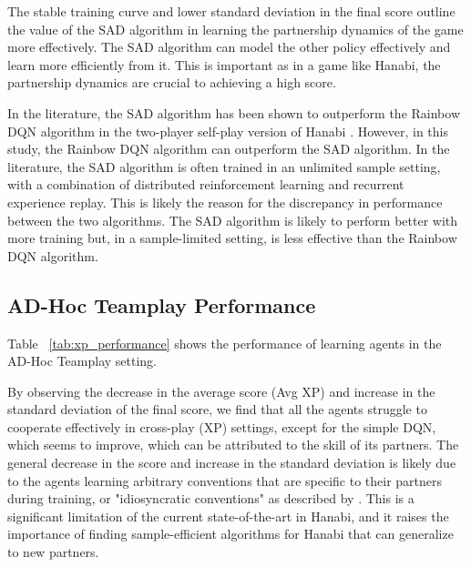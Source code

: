 The stable training curve and lower standard deviation in the final score outline the value of the SAD algorithm in learning the partnership dynamics of the game more effectively. The SAD algorithm can model the other policy effectively and learn more efficiently from it. This is important as in a game like Hanabi, the partnership dynamics are crucial to achieving a high score.

In the literature, the SAD algorithm has been shown to outperform the Rainbow DQN algorithm in the two-player self-play version of Hanabi \cite{huSimplifiedActionDecoder2021}. However, in this study, the Rainbow DQN algorithm can outperform the SAD algorithm. In the literature, the SAD algorithm is often trained in an unlimited sample setting, with a combination of distributed reinforcement learning and recurrent experience replay. This is likely the reason for the discrepancy in performance between the two algorithms. The SAD algorithm is likely to perform better with more training but, in a sample-limited setting, is less effective than the Rainbow DQN algorithm.

\subsection*{AD-Hoc Teamplay Performance}

Table ~\ref{tab:xp_performance} shows the performance of learning agents in the AD-Hoc Teamplay setting.

By observing the decrease in the average score (Avg XP) and increase in the standard deviation of the final score, we find that all the agents struggle to cooperate effectively in cross-play (XP) settings, except for the simple DQN, which seems to improve, which can be attributed to the skill of its partners. The general decrease in the score and increase in the standard deviation is likely due to the agents learning arbitrary conventions that are specific to their partners during training, or "idiosyncratic conventions" as described by \textcite{lucasAnyPlayIntrinsicAugmentation2022}. This is a significant limitation of the current state-of-the-art in Hanabi, and it raises the importance of finding sample-efficient algorithms for Hanabi that can generalize to new partners.

